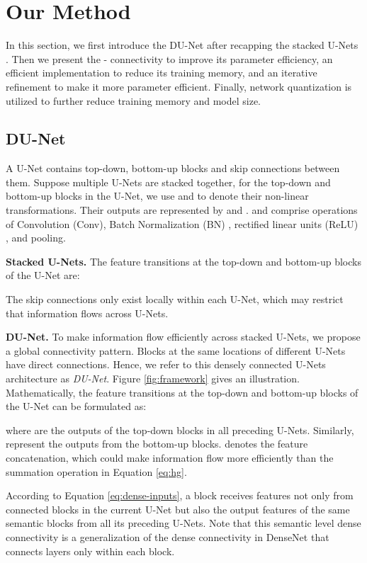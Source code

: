 \documentclass[runningheads]{llncs}
\begin{document}
%
 \section{Our Method}
In this section, we first introduce the DU-Net after recapping the stacked U-Nets \cite{newell2016stacked}. Then we present the - connectivity to improve its parameter efficiency, an efficient implementation to reduce its training memory,
and an iterative refinement to make it more parameter efficient.
Finally, network quantization is utilized to further reduce training memory and model size.
\subsection{DU-Net}
A U-Net contains top-down, bottom-up blocks and skip connections between them. Suppose multiple U-Nets are stacked together, for the  top-down and bottom-up blocks in the  U-Net, we use  and  to denote their non-linear transformations. Their outputs are represented by  and .  and  comprise operations of Convolution (Conv), Batch Normalization (BN) \cite{ioffe2015batch}, rectified linear units (ReLU) \cite{glorot2011deep}, and pooling.


{\bf Stacked U-Nets.} The feature transitions at the  top-down and bottom-up blocks of the  U-Net are:


The skip connections only exist locally within each U-Net, which may restrict that information flows across U-Nets.


{\bf DU-Net.} To make information flow efficiently across stacked U-Nets, we propose a global connectivity pattern. Blocks at the same locations of different U-Nets have direct connections. Hence, we refer to this densely connected U-Nets architecture as {\it DU-Net}. Figure \ref{fig:framework} gives an illustration. Mathematically, the feature transitions at the  top-down and bottom-up blocks of the  U-Net can be formulated as:

where  are the outputs of the  top-down blocks in all preceding U-Nets. Similarly,  represent the outputs from the  bottom-up blocks.  denotes the feature concatenation, which could make information flow more efficiently than the summation operation in Equation \ref{eq:hg}. 

According to Equation \ref{eq:dense-inputs}, a block receives features not only from connected blocks in the current U-Net but also the output features of the same semantic blocks from all its preceding U-Nets. Note that this semantic level dense connectivity is a generalization of the dense connectivity in DenseNet \cite{huang2016densely} that connects layers only within each block.
\end{document}
